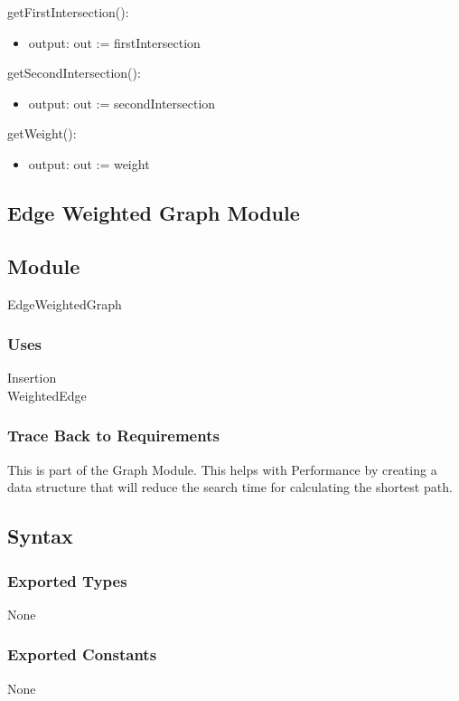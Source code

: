 \documentclass[12pt]{article}
\begin{document}
\noindent getFirstIntersection():
\begin{itemize}
    \item output: out := firstIntersection
\end{itemize}

\noindent getSecondIntersection():
\begin{itemize}
    \item output: out := secondIntersection
\end{itemize}

\noindent getWeight():
\begin{itemize}
    \item output: out := weight
\end{itemize}

\newpage
\subsection{Edge Weighted Graph Module}
\subsection*{Module}
EdgeWeightedGraph

\subsubsection*{Uses}
Insertion\\
WeightedEdge

\subsubsection*{Trace Back to Requirements}
This is part of the Graph Module. This helps with Performance by creating a data structure that will reduce the search time for calculating the shortest path.

\subsection*{Syntax}
\subsubsection*{Exported Types}
None

\subsubsection*{Exported Constants}
None
\end{document}

